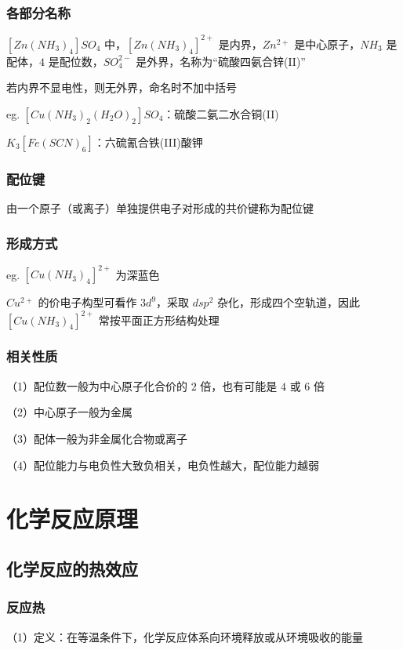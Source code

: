\documentclass[UTF8,zihao=-4,openany]{ctexbook}
\begin{document}
\subsection{各部分名称}
$[Zn(NH_3)_4]SO_4$ 中，$[Zn(NH_3)_4]^{2+}$ 是内界，$Zn^{2+}$ 是中心原子，$NH_3$ 是配体，$4$ 是配位数，$SO_4^{2-}$ 是外界，名称为“硫酸四氨合锌(II)”\par

若内界不显电性，则无外界，命名时不加中括号\par

eg. $[Cu(NH_3)_2(H_2O)_2]SO_4$：硫酸二氨二水合铜(II)\par

$K_3[Fe(SCN)_6]$：六硫氰合铁(III)酸钾\par
\subsection{配位键}
由一个原子（或离子）单独提供电子对形成的共价键称为配位键\par
\subsection{形成方式}
eg. $[Cu(NH_3)_4]^{2+}$ 为深蓝色\par

$Cu^{2+}$ 的价电子构型可看作 $3d^9$，采取 $dsp^2$ 杂化，形成四个空轨道，因此 $[Cu(NH_3)_4]^{2+}$ 常按平面正方形结构处理\par
\subsection{相关性质}
（1）配位数一般为中心原子化合价的 $2$ 倍，也有可能是 $4$ 或 $6$ 倍\par

（2）中心原子一般为金属\par

（3）配体一般为非金属化合物或离子\par

（4）配位能力与电负性大致负相关，电负性越大，配位能力越弱\par
\chapter{化学反应原理}
\section{化学反应的热效应}
\subsection{反应热}
（1）定义：在等温条件下，化学反应体系向环境释放或从环境吸收的能量\par
\end{document}
